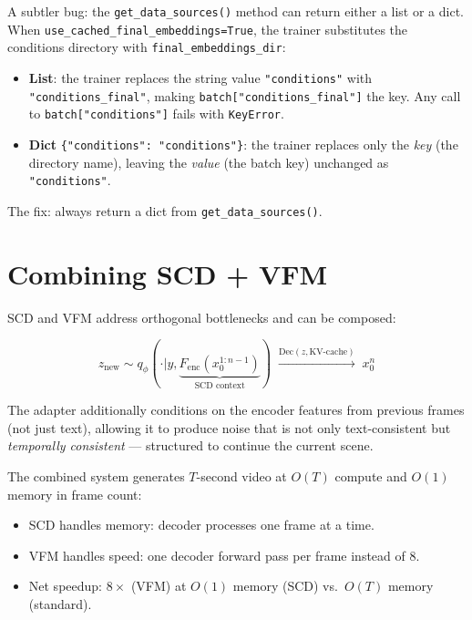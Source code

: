 \documentclass[10pt,twocolumn]{article}
\begin{document}
A subtler bug: the \texttt{get\_data\_sources()} method can return either a list or a dict. When \texttt{use\_cached\_final\_embeddings=True}, the trainer substitutes the conditions directory with \texttt{final\_embeddings\_dir}:
\begin{itemize}[nosep]
  \item \textbf{List}: the trainer replaces the string value \texttt{"conditions"} with \texttt{"conditions\_final"}, making \texttt{batch["conditions\_final"]} the key. Any call to \texttt{batch["conditions"]} fails with \texttt{KeyError}.
  \item \textbf{Dict} \texttt{\{"conditions": "conditions"\}}: the trainer replaces only the \emph{key} (the directory name), leaving the \emph{value} (the batch key) unchanged as \texttt{"conditions"}.
\end{itemize}
The fix: always return a dict from \texttt{get\_data\_sources()}.

\section{Combining SCD + VFM}
\label{sec:scd_vfm}

SCD and VFM address orthogonal bottlenecks and can be composed:

\begin{equation}
  z_{\text{new}} \sim q_\phi(\cdot | y, \underbrace{F_{\text{enc}}(x_0^{1:n-1})}_{\text{SCD context}}) \;\xrightarrow{\text{Dec}(z, \text{KV-cache})}\; x_0^n
\end{equation}

The adapter additionally conditions on the encoder features from previous frames (not just text), allowing it to produce noise that is not only text-consistent but \emph{temporally consistent} — structured to continue the current scene.

The combined system generates $T$-second video at $O(T)$ compute and $O(1)$ memory in frame count:
\begin{itemize}[nosep]
  \item SCD handles memory: decoder processes one frame at a time.
  \item VFM handles speed: one decoder forward pass per frame instead of 8.
  \item Net speedup: $8 \times$ (VFM) at $O(1)$ memory (SCD) vs.\ $O(T)$ memory (standard).
\end{itemize}
\end{document}
